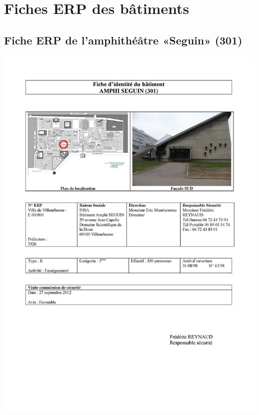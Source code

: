 \documentclass[hidelinks, paper=a4, fontsize=13pt]{report}
\begin{document}
\section{Fiches ERP des bâtiments}

\subsection{Fiche ERP de l’amphithéâtre «Seguin» (301)}
\begin{center}
\includegraphics[scale=0.5]{Annexes/Documents/ERPSeguin}
\end{center}
\end{document}
